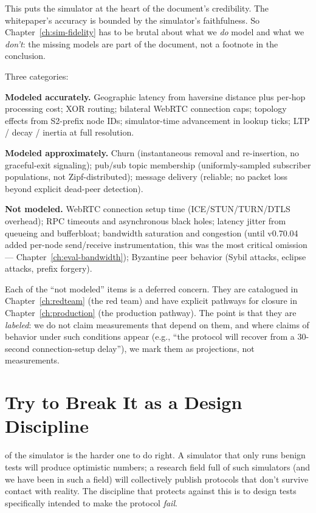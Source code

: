 \documentclass[twoside,nobib]{tufte-book}
\begin{document}
This puts the simulator at the heart of the document's
credibility. The whitepaper's accuracy is bounded by the
simulator's faithfulness. So Chapter~\ref{ch:sim-fidelity} has
to be brutal about what we \emph{do} model and what we
\emph{don't}: the missing models are part of the document, not a
footnote in the conclusion.

Three categories:

\textbf{Modeled accurately.} Geographic latency from haversine
distance plus per-hop processing cost; XOR routing; bilateral
WebRTC connection caps; topology effects from S2-prefix node
IDs; simulator-time advancement in lookup ticks; LTP / decay /
inertia at full resolution.

\textbf{Modeled approximately.} Churn (instantaneous removal and
re-insertion, no graceful-exit signaling); pub/sub topic
membership (uniformly-sampled subscriber populations, not
Zipf-distributed); message delivery (reliable; no packet loss
beyond explicit dead-peer detection).

\textbf{Not modeled.} WebRTC connection setup time
(ICE/STUN/TURN/DTLS overhead); RPC timeouts and asynchronous
black holes; latency jitter from queueing and bufferbloat;
bandwidth saturation and congestion (until v0.70.04 added
per-node send/receive instrumentation, this was the most
critical omission --- Chapter~\ref{ch:eval-bandwidth}); Byzantine
peer behavior (Sybil attacks, eclipse attacks, prefix forgery).

Each of the ``not modeled'' items is a deferred concern. They
are catalogued in Chapter~\ref{ch:redteam} (the red team) and
have explicit pathways for closure in Chapter~\ref{ch:production}
(the production pathway). The point is that they are
\emph{labeled}: we do not claim measurements that depend on them,
and where claims of behavior under such conditions appear (e.g.,
``the protocol will recover from a 30-second connection-setup
delay''), we mark them as projections, not measurements.

\section{Try to Break It as a Design Discipline}

 of the simulator is the harder one
to do right. A simulator that only runs benign tests will
produce optimistic numbers; a research field full of such
simulators (and we have been in such a field) will collectively
publish protocols that don't survive contact with reality. The
discipline that protects against this is to design tests
specifically intended to make the protocol \emph{fail}.
\end{document}
